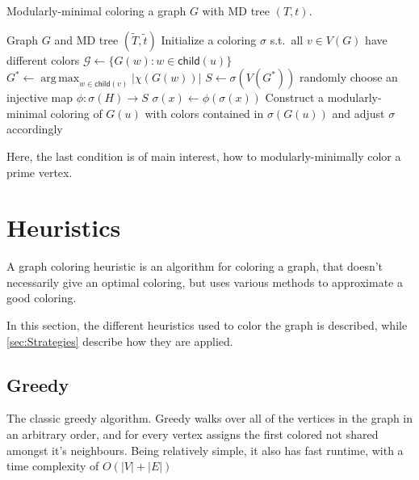 \documentclass[a4paper]{article}
\newcommand{\child}{\mathsf{child}}
\DeclareMathOperator*{\argmax}{arg\,max}
\newcommand{\T}{\widetilde{T}}
\renewcommand{\t}{\widetilde{t}}
\begin{document}
\begin{algorithm}[H]
  \caption{Modularly-minimal coloring a graph $G$ with MD tree $(T,t)$.}
  \label{alg:generic}
  \begin{algorithmic}[1]
    \REQUIRE Graph $G$ and MD tree $(\T,\t)$
    \STATE Initialize a coloring $\sigma$ s.t.\ all $v \in V(G)$
           have different colors
          \STATE $\mathcal{G} \leftarrow \{G(w)\colon w\in\child(u)\}$ 
          \STATE $G^* \leftarrow \argmax_{w\in\child(v)} |\chi(G(w))|$
          \STATE $S \leftarrow \sigma(V(G^*))$ 
             \STATE randomly choose an injective map $\phi:\sigma(H)\to S$
                \STATE $\sigma(x)\leftarrow \phi(\sigma(x))$  
             \ENDFOR
          \ENDFOR
          \STATE Construct a modularly-minimal coloring of $G(u)$
              with colors contained in $\sigma(G(u))$
              and adjust $\sigma$ accordingly 
       \ENDIF
    \ENDFOR
  \end{algorithmic}
\end{algorithm}

Here, the last condition is of main interest, how to modularly-minimally 
color a prime vertex.

\section{Heuristics}
\label{sec:Heuristics}

A graph coloring heuristic is an algorithm for coloring a graph, that doesn't
necessarily give an optimal coloring, but uses various methods to approximate a
good coloring.


In this section, the different heuristics used to color the graph is described,
while \autoref{sec:Strategies} describe how they are applied.
\subsection{Greedy}
The classic greedy algorithm. Greedy walks over all of the vertices in the graph
in an arbitrary order, and for every vertex assigns the first colored not shared
amongst it's neighbours. Being relatively simple, it also has fast runtime, with
a time complexity of $O(|V|+|E|)$ \cite{Constructive}
\end{document}
